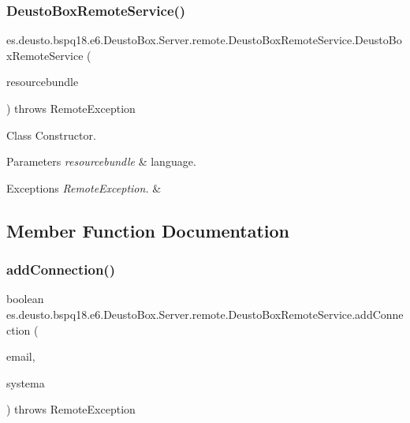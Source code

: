 \subsubsection{\texorpdfstring{Deusto\+Box\+Remote\+Service()}{DeustoBoxRemoteService()}}
{\footnotesize\ttfamily es.\+deusto.\+bspq18.\+e6.\+Deusto\+Box.\+Server.\+remote.\+Deusto\+Box\+Remote\+Service.\+Deusto\+Box\+Remote\+Service (\begin{DoxyParamCaption}\item[{Resource\+Bundle}]{resourcebundle }\end{DoxyParamCaption}) throws Remote\+Exception}

Class Constructor. 
\begin{DoxyParams}{Parameters}
{\em resourcebundle} & language. \\
\hline
\end{DoxyParams}

\begin{DoxyExceptions}{Exceptions}
{\em Remote\+Exception.} & \\
\hline
\end{DoxyExceptions}


\subsection{Member Function Documentation}
\mbox{\label{classes_1_1deusto_1_1bspq18_1_1e6_1_1_deusto_box_1_1_server_1_1remote_1_1_deusto_box_remote_service_af3b4ec328dd57b15aefff6d9112dab94}} 
\subsubsection{\texorpdfstring{add\+Connection()}{addConnection()}}
{\footnotesize\ttfamily boolean es.\+deusto.\+bspq18.\+e6.\+Deusto\+Box.\+Server.\+remote.\+Deusto\+Box\+Remote\+Service.\+add\+Connection (\begin{DoxyParamCaption}\item[{String}]{email,  }\item[{String}]{systema }\end{DoxyParamCaption}) throws Remote\+Exception}


